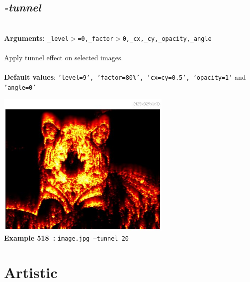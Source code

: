 \documentclass[a4paper,11pt,twoside]{book}
\begin{document}
\subsection{\emph{-tunnel} }\vspace*{-0.5em}
~\\\textbf{Arguments: } 
{\small \texttt{\_level$>$=0,\_factor$>$0,\_cx,\_cy,\_opacity,\_angle}}\\~\\
Apply tunnel effect on selected images.
~\\~\\\textbf{Default values}: {\small \texttt{'level=9', 'factor=80\%', 'cx=cy=0.5', 'opacity=1'} and \texttt{'angle=0'}}
\begin{center}\includegraphics[keepaspectratio=true,height=7cm,width=\textwidth]{img/gmic_def518.jpg}\\
{\footnotesize \textbf{Example 518~:} \texttt{image.jpg --tunnel 20}}
\end{center}
\section{Artistic}
\end{document}

